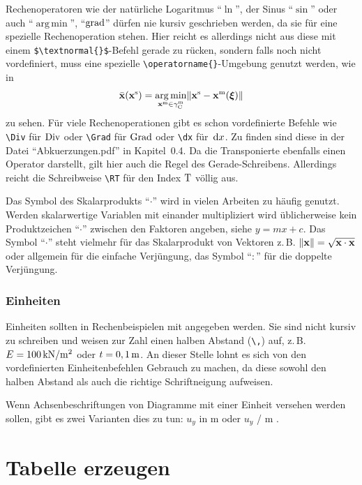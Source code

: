 Rechenoperatoren wie der natürliche Logaritmus "`$\ln$"', der Sinus "`$\sin$"' oder auch
"`$\operatorname{arg\,min}$"', "`$\operatorname{grad}$"' dürfen nie kursiv geschrieben werden,
da sie für eine spezielle Rechenoperation stehen. Hier reicht es allerdings
nicht aus diese mit einem \verb+$\textnormal{}$+-Befehl gerade zu rücken,
sondern falls noch nicht vordefiniert, muss eine spezielle
\verb+\operatorname{}+-Umgebung genutzt werden, wie in
\begin{align}
\bar{{\mathbf x}} ({\mathbf x}^{\mathrm{s}}) = \underset{{\mathbf x}^{\mathrm{m}} \in {\gamma}_{\mathrm{C}}^{\mathrm{m}}
}{\operatorname{arg\,min}} \| {\mathbf x}^{\mathrm{s}} - {\mathbf x}^{\mathrm{m}}({\boldsymbol \xi}) \|
\end{align}
zu sehen. Für viele Rechenoperationen gibt es schon vordefinierte Befehle wie
\verb+\Div+ für $\operatorname{Div}$ oder \verb+\Grad+ für $\operatorname{Grad}$ oder \verb+\dx+ für $\,{\mathrm{d}} x$.
Zu finden sind diese in der Datei "`Abkuerzungen.pdf"' in Kapitel~0.4.
Da die Transponierte ebenfalls einen Operator darstellt, gilt hier auch die
Regel des Gerade-Schreibens. Allerdings reicht die Schreibweise
\verb+\RT+ für den Index ${\mathrm{T}}$ völlig aus.

Das Symbol des Skalarprodukts "`$\cdot$"' wird in vielen Arbeiten zu häufig
genutzt. Werden skalarwertige Variablen mit einander multipliziert wird
üblicherweise kein Produktzeichen "`$\cdot$"' zwischen den Faktoren angeben,
siehe $y=mx+c$.
Das Symbol "`$\cdot$"' steht vielmehr für das Skalarprodukt von Vektoren
z.\,B. $\|{\mathbf x}\| = \sqrt{{\mathbf x} \cdot {\mathbf x}}$ oder allgemein für die einfache
Verjüngung, das Symbol "`$:$"' für die doppelte Verjüngung.


\subsubsection{Einheiten}

Einheiten sollten in Rechenbeispielen mit angegeben werden. Sie sind nicht
kursiv zu schreiben und weisen zur Zahl einen halben Abstand (\verb+\,+) auf,
z.\,B. $E= 100\,\mathrm{kN/m^2}$ oder $t=0,1\,\mathrm{m}$. An dieser Stelle lohnt es sich von den
vordefinierten Einheitenbefehlen Gebrauch zu machen, da diese sowohl den halben
Abstand als auch die richtige Schriftneigung aufweisen.

Wenn Achsenbeschriftungen von Diagramme mit einer Einheit versehen werden
sollen, gibt es zwei Varianten dies zu tun:  $u_y$ in m oder $u_y$ / m .




\section{Tabelle erzeugen}

